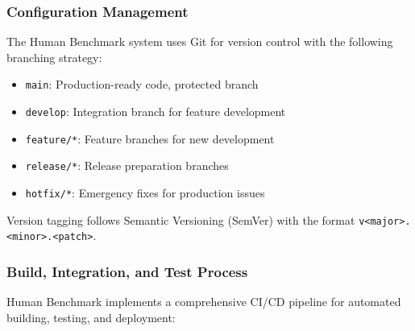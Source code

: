 \subsubsection{Configuration Management}

The Human Benchmark system uses Git for version control with the following branching strategy:

\begin{itemize}
    \item \texttt{main}: Production-ready code, protected branch
    \item \texttt{develop}: Integration branch for feature development
    \item \texttt{feature/*}: Feature branches for new development
    \item \texttt{release/*}: Release preparation branches
    \item \texttt{hotfix/*}: Emergency fixes for production issues
\end{itemize}

Version tagging follows Semantic Versioning (SemVer) with the format \texttt{v<major>.<minor>.<patch>}.

\subsubsection{Build, Integration, and Test Process}

Human Benchmark implements a comprehensive CI/CD pipeline for automated building, testing, and deployment:

